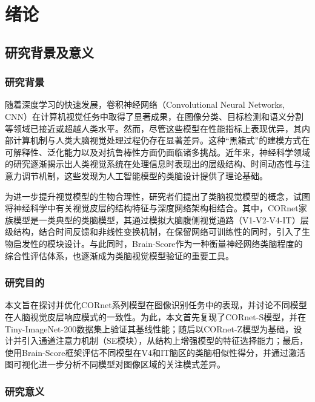 
\chapter{绪论}

\section{研究背景及意义}

\subsection{研究背景}

随着深度学习的快速发展，卷积神经网络（Convolutional Neural Networks, CNN）在计算机视觉任务中取得了显著成果，在图像分类、目标检测和语义分割等领域已接近或超越人类水平。然而，尽管这些模型在性能指标上表现优异，其内部计算机制与人类大脑视觉处理过程仍存在显著差异。这种“黑箱式”的建模方式在可解释性、泛化能力以及对抗鲁棒性方面仍面临诸多挑战。近年来，神经科学领域的研究逐渐揭示出人类视觉系统在处理信息时表现出的层级结构、时间动态性与注意力调节机制，这些发现为人工智能模型的类脑设计提供了理论基础。

为进一步提升视觉模型的生物合理性，研究者们提出了类脑视觉模型的概念，试图将神经科学中有关视觉皮层的结构特征与深度网络架构相结合。其中，CORnet家族模型是一类典型的类脑模型，其通过模拟大脑腹侧视觉通路（V1-V2-V4-IT）层级结构，结合时间反馈和非线性变换机制，在保留网络可训练性的同时，引入了生物启发性的模块设计。与此同时，Brain-Score作为一种衡量神经网络类脑程度的综合性评估体系，也逐渐成为类脑视觉模型验证的重要工具。

\subsection{研究目的}

本文旨在探讨并优化CORnet系列模型在图像识别任务中的表现，并讨论不同模型在人脑视觉皮层响应模式的一致性。为此，本文首先复现了CORnet-S模型，并在Tiny-ImageNet-200数据集上验证其基线性能；随后以CORnet-Z模型为基础，设计并引入通道注意力机制（SE模块），从结构上增强模型的特征选择能力；最后，使用Brain-Score框架评估不同模型在V4和IT脑区的类脑相似性得分，并通过激活图可视化进一步分析不同模型对图像区域的关注模式差异。

\subsection{研究意义}

